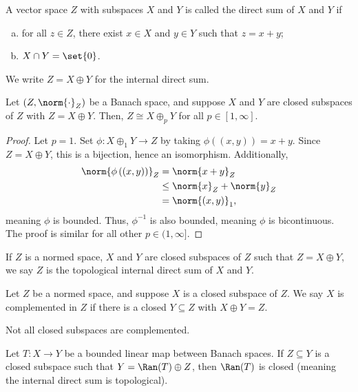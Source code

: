 \documentclass[10pt]{mypackage}
\begin{document}
  A vector space $Z$ with subspaces $X$ and $Y$ is called the direct sum of $X$ and $Y$ if
  \begin{enumerate}[(a)]
    \item for all $z\in Z$, there exist $x\in X$ and $y\in Y$ such that $z = x+y$;
    \item $X\cap Y = \set{0}$.
  \end{enumerate}
  We write $Z = X\oplus Y$ for the internal direct sum.
  \begin{proposition}
    Let $\left(Z,\norm{\cdot}_Z\right)$ be a Banach space, and suppose $X$ and $Y$ are closed subspaces of $Z$ with $Z = X\oplus Y$. Then, $Z\cong X\oplus_{p}Y$ for all $p\in [1,\infty]$.
  \end{proposition}
  \begin{proof}
    Let $p = 1$. Set $\phi: X\oplus_{1}Y \rightarrow Z$ by taking $\phi\left((x,y)\right) = x + y$. Since $Z = X\oplus Y$, this is a bijection, hence an isomorphism. Additionally,
    \begin{align*}
      \norm{\phi\left(\left(x,y\right)\right)}_{Z} &= \norm{x + y}_Z\\
                                                   &\leq \norm{x}_Z + \norm{y}_Z\\
                                                   &= \norm{\left(x,y\right)}_1,
    \end{align*}
    meaning $\phi$ is bounded. Thus, $\phi^{-1}$ is also bounded, meaning $\phi$ is bicontinuous. The proof is similar for all other $p\in (1,\infty]$.
  \end{proof}
  \begin{definition}
    If $Z$ is a normed space, $X$ and $Y$ are closed subspaces of $Z$ such that $Z = X\oplus Y$, we say $Z$ is the topological internal direct sum of $X$ and $Y$.
  \end{definition}
  \begin{definition}
    Let $Z$ be a normed space, and suppose $X$ is a closed subspace of $Z$. We say $X$ is complemented in $Z$ if there is a closed $Y\subseteq Z$ with $X\oplus Y = Z$.
  \end{definition}
  Not all closed subspaces are complemented.
  \begin{proposition}
    Let $T: X\rightarrow Y$ be a bounded linear map between Banach spaces. If $Z\subseteq Y$ is a closed subspace such that $Y = \Ran(T) \oplus Z$, then $\Ran(T)$ is closed (meaning the internal direct sum is topological).
  \end{proposition}
\end{document}
